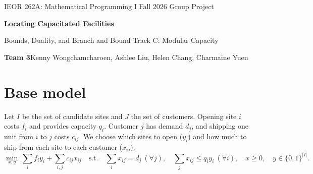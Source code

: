 \documentclass[11pt]{article}
\theoremstyle{definition}
\begin{document}
\begingroup
\setlength{\parindent}{0pt}
\large
IEOR 262A: Mathematical Programming I \hfill Fall 2026 Group Project\par
\vspace{6pt}
{\huge\bfseries Locating Capacitated Facilities\par}
\vspace{2pt}
Bounds, Duality, and Branch and Bound \hfill Track C: Modular Capacity\par
\vspace{6pt}
\textbf{Team 3}\quad Kenny Wongchamcharoen, Ashlee Liu, Helen Chang, Charmaine Yuen\par
\endgroup


\section{Base model}
Let $I$ be the set of candidate sites and $J$ the set of customers. Opening site $i$ costs $f_i$ and provides capacity $q_i$. Customer $j$ has demand $d_j$, and shipping one unit from $i$ to $j$ costs $c_{ij}$. We choose which sites to open ($y_i$) and how much to ship from each site to each customer ($x_{ij}$).
{
\begin{equation}
\tag{CFL}
\textstyle
\min_{x,y}\ \sum_i f_i y_i + \sum_{i,j} c_{ij}x_{ij}
\quad \text{s.t.}\quad
\sum_i x_{ij}=d_j\ (\forall j),\quad
\sum_j x_{ij}\le q_i y_i\ (\forall i),\quad
x\ge 0,\quad y\in\{0,1\}^{|I|}.
\end{equation}
}
\end{document}
